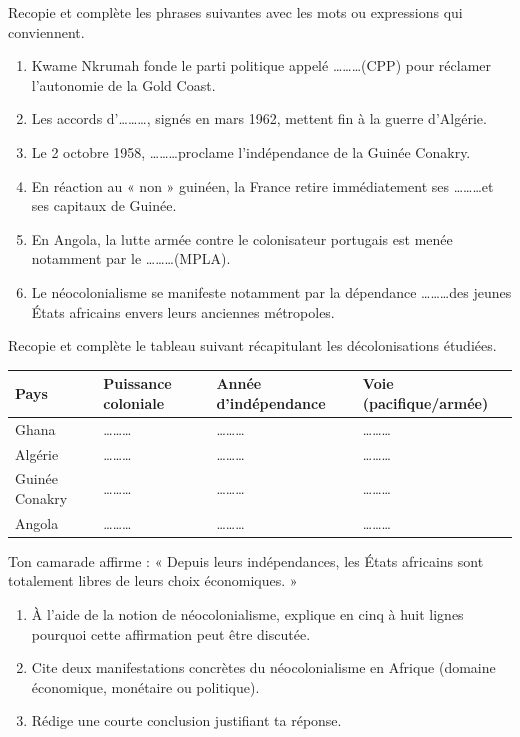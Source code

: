 \documentclass[11pt]{article}
\begin{document}
\begin{exercice}
Recopie et complète les phrases suivantes avec les mots ou expressions qui conviennent.
\begin{enumerate}
\item Kwame Nkrumah fonde le parti politique appelé \ldots\ldots\ldots (CPP) pour réclamer l'autonomie de la Gold Coast.
\item Les accords d'\ldots\ldots\ldots, signés en mars 1962, mettent fin à la guerre d'Algérie.
\item Le 2 octobre 1958, \ldots\ldots\ldots proclame l'indépendance de la Guinée Conakry.
\item En réaction au « non » guinéen, la France retire immédiatement ses \ldots\ldots\ldots et ses capitaux de Guinée.
\item En Angola, la lutte armée contre le colonisateur portugais est menée notamment par le \ldots\ldots\ldots (MPLA).
\item Le néocolonialisme se manifeste notamment par la dépendance \ldots\ldots\ldots des jeunes États africains envers leurs anciennes métropoles.
\end{enumerate}
\end{exercice}

\begin{exercice}
Recopie et complète le tableau suivant récapitulant les décolonisations étudiées.
\begin{center}
\begin{tabular}{|l|l|l|l|}
\hline
\textbf{Pays} & \textbf{Puissance coloniale} & \textbf{Année d'indépendance} & \textbf{Voie (pacifique/armée)} \\
\hline
Ghana & \ldots\ldots\ldots & \ldots\ldots\ldots & \ldots\ldots\ldots \\
\hline
Algérie & \ldots\ldots\ldots & \ldots\ldots\ldots & \ldots\ldots\ldots \\
\hline
Guinée Conakry & \ldots\ldots\ldots & \ldots\ldots\ldots & \ldots\ldots\ldots \\
\hline
Angola & \ldots\ldots\ldots & \ldots\ldots\ldots & \ldots\ldots\ldots \\
\hline
\end{tabular}
\end{center}
\end{exercice}

\begin{exercice}
Ton camarade affirme : « Depuis leurs indépendances, les États africains sont totalement libres de leurs choix économiques. »
\begin{enumerate}
\item À l'aide de la notion de néocolonialisme, explique en cinq à huit lignes pourquoi cette affirmation peut être discutée.
\item Cite deux manifestations concrètes du néocolonialisme en Afrique (domaine économique, monétaire ou politique).
\item Rédige une courte conclusion justifiant ta réponse.
\end{enumerate}
\end{exercice}
\end{document}
